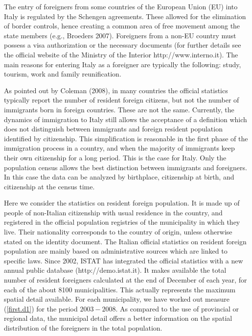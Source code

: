 \documentclass[10pt] {article}
\theoremstyle{definition}
\theoremstyle{plain}
\begin{document}
The entry of foreigners from some countries of the European Union (EU) into Italy is regulated by the Schengen agreements. These allowed for the elimination of border controls, hence creating a common area of free movement among the state members (e.g., Broeders 2007). Foreigners from a non-EU country must possess a visa authorization or the necessary documents (for further details see the official website of the Ministry of the Interior http://www.interno.it). The main reasons for entering Italy as a foreigner are typically the following: study, tourism, work and family reunification. 

As pointed out by Coleman (2008), in many countries the official statistics typically report the number of resident foreign citizens, but not the number of immigrants born in foreign countries. These are not the same. Currently, the dynamics of immigration to Italy still allows the acceptance of a definition which does not distinguish between immigrants and foreign resident population identified by citizenship. This simplification is reasonable in the first phase of the immigration process in a country, and when the majority of immigrants keep their own citizenship for a long period. This is the case for Italy. Only the population census allows the best distinction between immigrants and foreigners. In this case the data can be analyzed by birthplace, citizenship at birth, and citizenship at the census time. 

Here we consider the statistics on resident foreign population. It is made up of people of non-Italian citizenship with usual residence in the country, and registered in the official population registries of the municipality in which they live. Their nationality corresponds to the country of origin, unless otherwise stated on the identity document. The Italian official statistics on resident foreign population are mainly based on administrative sources which are linked to specific laws. Since 2002, ISTAT has integrated the official statistics with a new annual public database (http://demo.istat.it). It makes available the total number of resident foreigners calculated at the end of December of each year, for each of the about 8100 municipalities. This actually represents the maximum spatial detail available. For each municipality, we have worked out measure (\ref{first.d1}) for the period $2003-2008$. As compared to the use of provincial or regional data, the municipal detail offers a better information on the spatial distribution of the foreigners in the total population.
\end{document}
